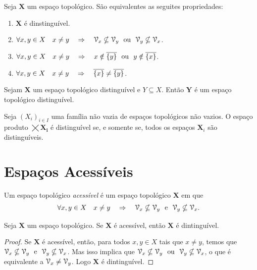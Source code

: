 \begin{prop}
	Seja $\bm X$ um espaço topológico. São equivalentes as seguites propriedades:
	\begin{enumerate}
	\item $\bm X$ é dinstinguível.
	\item $\forall x,y \in X \quad x \neq y \quad \Rightarrow \quad \mathcal{V}_x \nsubseteq \mathcal{V}_y \text{\ \ ou\ \ } \mathcal{V}_y \nsubseteq \mathcal{V}_x$.
	\item $\forall x,y \in X \quad x \neq y \quad \Rightarrow \quad x \notin \overline{\{y\}} \text{\ \ ou\ \ } y \notin \overline{\{x\}}$.
	\item $\forall x,y \in X \quad x \neq y \quad \Rightarrow \quad \overline{\{x\}} \neq \overline{\{y\}}$.	
\end{enumerate}
\end{prop}

\begin{prop}
	Sejam $\bm X$ um espaço topológico distinguível e $Y \subseteq X$. Então $\bm Y$ é um espaço topológico distinguível.
\end{prop}

\begin{prop}
	Seja $(X_i)_{i \in I}$ uma família não vazia de espaços topológicos não vazios. O espaço produto $\bm{\bigtimes X_i}$ é distinguível se, e somente se, todos os espaços $\bm X_i$ são distinguíveis.
\end{prop}

\section{Espaços Acessíveis}

\begin{defi}[$T_1$]
	Um espaço topológico \emph{acessível} é um espaço topológico $\bm X$ em que
	\begin{equation*}
	\forall x,y \in X \quad x \neq y \quad \Rightarrow \quad \mathcal{V}_x \nsubseteq \mathcal{V}_y \text{\ \ e\ \ } \mathcal{V}_y \nsubseteq \mathcal{V}_x.
	\end{equation*}
\end{defi}

\begin{prop}[$T_1 \Rightarrow T_0$]
	Seja $\bm X$ um espaço topológico. Se $\bm X$ é acessível, então $\bm X$ é dintinguível.
\end{prop}
\begin{proof}
	Se $\bm X$ é acessível, então, para todos $x,y \in X$ tais que $x \neq y$, temos que $\mathcal{V}_x \nsubseteq \mathcal{V}_y \text{\ \ e\ \ } \mathcal{V}_y \nsubseteq \mathcal{V}_x$. Mas isso implica que $\mathcal{V}_x \nsubseteq \mathcal{V}_y \text{\ \ ou\ \ } \mathcal{V}_y \nsubseteq \mathcal{V}_x$, o que é equivalente a $\mathcal{V}_x \neq \mathcal{V}_y$. Logo $\bm X$ é dintinguível.
\end{proof}

